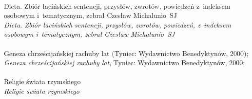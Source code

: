 \documentclass[a4paper,11pt]{article}
\begin{document}
\begin{center}
\end{center}
\noindent
{} \\
\Jest Dicta. Zbiór łacińskich sentencji, przysłów, zwrotów, powiedzeń
z~indeksem osobowym i~tematycznym, zebrał Czesław Michalunio~SJ \\
\Powin \emph{Dicta. Zbiór łacińskich sentencji, przysłów, zwrotów,
  powiedzeń, z~indeksem osobowym i~tematycznym,
  zebrał Czesław Michalunio~SJ} \\
 \\
\Jest Geneza chrześcijańskiej rachuby lat (Tyniec: Wydawnictwo
Benedyktynów, 2000); \\
\Powin \emph{Geneza chrześcijańskiej rachuby lat}, Tyniec: Wydawnictwo
Benedyktynów, 2000; \\
 \\
\Jest  Religie świata rzymskiego \\
\Powin \emph{Religie świata rzymskiego} \\
\end{document}
